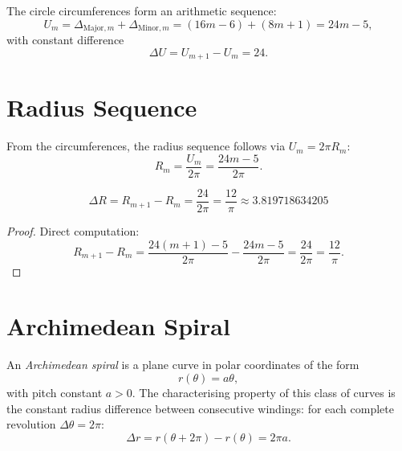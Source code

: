 \begin{satz}
The circle circumferences form an arithmetic sequence:
\begin{equation}
  U_m = \Delta_{\mathrm{Major},m} + \Delta_{\mathrm{Minor},m}
      = (16m-6) + (8m+1)
      = 24m - 5,
\end{equation}
with constant difference
\[
  \Delta U = U_{m+1} - U_m = 24.
\]
\end{satz}

\section{Radius Sequence}

From the circumferences, the radius sequence follows via $U_m = 2\pi R_m$:
\begin{equation}
  R_m = \frac{U_m}{2\pi} = \frac{24m - 5}{2\pi}.
\end{equation}

\begin{satz}
\begin{equation}
  \boxed{\Delta R = R_{m+1} - R_m = \frac{24}{2\pi} = \frac{12}{\pi}
  \approx 3.819718634205}
\end{equation}
\end{satz}

\begin{proof}
Direct computation:
\[
  R_{m+1} - R_m
  = \frac{24(m+1)-5}{2\pi} - \frac{24m-5}{2\pi}
  = \frac{24}{2\pi}
  = \frac{12}{\pi}.
\]
\end{proof}

\section{Archimedean Spiral}

\begin{definition}
An \emph{Archimedean spiral} is a plane curve in polar coordinates
of the form
\[
  r(\theta) = a\theta,
\]
with pitch constant $a > 0$. The characterising property of this
class of curves is the constant radius difference between consecutive
windings: for each complete revolution $\Delta\theta = 2\pi$:
\[
  \Delta r = r(\theta + 2\pi) - r(\theta) = 2\pi a.
\]
\end{definition}

